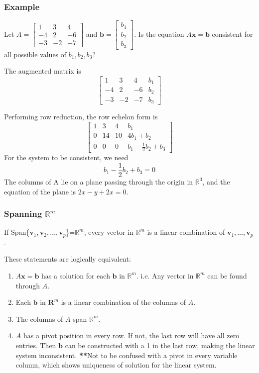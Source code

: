 \documentclass[../linear-algebra.tex]{subfiles}
\begin{document}
\subsubsection{Example}
\noindent Let $A = 
\begin{bmatrix} 
1 & 3 & 4 \\ 
-4 & 2 & -6 \\ 
-3 & -2 & -7 
\end{bmatrix}$ 
and $\mathbf{b} = 
\begin{bmatrix} 
b_1 \\ 
b_2 \\ 
b_3 
\end{bmatrix}$. 
Is the equation $A\mathbf{x} = \mathbf{b}$ consistent for all possible values of $b_1, b_2, b_3$?

\noindent The augmented matrix is
\[ 
\left[
\begin{array}{ccc|c}
1 & 3 & 4 & b_1 \\
-4 & 2 & -6 & b_2 \\
-3 & -2 & -7 & b_3
\end{array}
\right]
\]

\noindent Performing row reduction, the row echelon form is
\[
\left[
\begin{array}{ccc|c}
1 & 3 & 4 & b_1 \\
0 & 14 & 10 & 4b_1 + b_2 \\
0 & 0 & 0 & b_1 - \frac{1}{2}b_2 + b_3
\end{array}
\right]
\]
For the system to be consistent, we need
\[
b_1 - \frac{1}{2}b_2 + b_3 = 0
\]
The columns of A lie on a plane passing through the origin in $\mathbb{R}^3$,
and the equation of the plane is $2x-y+2x=0$.

\subsubsection{Spanning $\mathbb{R}^m$}
If Span\{$\mathbf{v}_1,\mathbf{v}_2,\ldots,\mathbf{v}_p$\}=$\mathbb{R}^m$, every vector in $\mathbb{R}^m$
is a linear combination of $\mathbf{v}_1,\ldots,\mathbf{v}_p$.

\medskip

\noindent These statements are logically equivalent:
\begin{enumerate}
    \item $A\mathbf{x} = \mathbf{b}$ has a solution for each $\mathbf{b}$ in $\mathbb{R}^m$.\newline
    i.e. Any vector in $\mathbb{R}^m$ can be found through $A$.
    \item Each $\mathbf{b}$ in $\mathbf{R}^m$ is a linear combination of the columns of $A$.
    \item The columns of $A$ span $\mathbb{R}^m$.
    \item $A$ has a pivot position in every row.\newline
    If not, the last row will have all zero entries. Then $\mathbf{b}$ can be constructed with a 1 in the last row,
    making the linear system inconsistent.\newline
    \textbf{**}Not to be confused with a pivot in every variable column, which shows uniqueness of solution for the linear system.
\end{enumerate}
\end{document}
